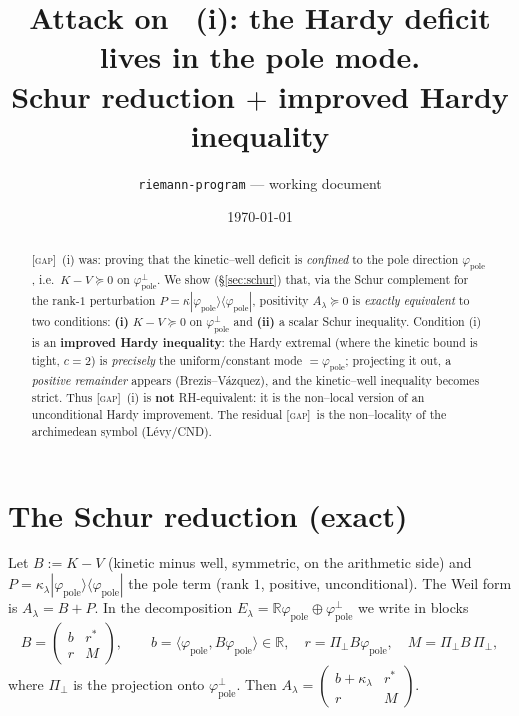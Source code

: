 \documentclass[11pt]{article}
\title{\textbf{Attack on \GAP\ (i): the Hardy deficit lives in the pole mode.\\
Schur reduction $+$ improved Hardy inequality}}
\author{\texttt{riemann-program} --- working document}
\date{\today}
\newcommand{\GAP}{\textcolor{red!75!black}{\textsc{[gap]}}}
\theoremstyle{plain}
\theoremstyle{definition}
\newcommand{\R}{\mathbb{R}}
\newcommand{\El}{E_\lambda}
\newcommand{\kin}{K}
\newcommand{\vv}{V}
\newcommand{\pole}{P}
\newcommand{\fp}{\varphi_{\mathrm{pole}}}
\begin{document}
\maketitle

\begin{abstract}
\GAP\ (i) was: proving that the kinetic--well deficit is \emph{confined} to the
pole direction $\fp$, i.e.\ $\kin-\vv\succeq0$ on $\fp^\perp$. We show
(\S\ref{sec:schur}) that, via the Schur complement for the rank-$1$ perturbation
$\pole=\kappa|\fp\rangle\langle\fp|$, positivity $A_\lambda\succeq0$ is \emph{exactly
equivalent} to two conditions: \textbf{(i)} $\kin-\vv\succeq0$ on $\fp^\perp$ and
\textbf{(ii)} a scalar Schur inequality. Condition (i) is an \textbf{improved Hardy
inequality}: the Hardy extremal (where the kinetic bound is tight, $c=2$) is
\emph{precisely} the uniform/constant mode $=\fp$; projecting it out, a \emph{positive
remainder} appears (Brezis--Vázquez), and the kinetic--well inequality becomes strict.
Thus \GAP\ (i) is \textbf{not} RH-equivalent: it is the non--local version of an
unconditional Hardy improvement. The residual \GAP\ is the non--locality of the
archimedean symbol (Lévy/CND).
\end{abstract}

\tableofcontents

\section{The Schur reduction (exact)}\label{sec:schur}

Let $B:=\kin-\vv$ (kinetic minus well, symmetric, on the arithmetic side) and
$\pole=\kappa_\lambda|\fp\rangle\langle\fp|$ the pole term (rank $1$, positive,
unconditional). The Weil form is $A_\lambda=B+\pole$. In the decomposition
$\El=\R\fp\oplus\fp^\perp$ we write in blocks
\[
  B=\begin{pmatrix} b & r^* \\ r & M\end{pmatrix},
  \qquad
  b=\langle\fp,B\fp\rangle\in\R,\quad r=\Pi_\perp B\fp,\quad M=\Pi_\perp B\,\Pi_\perp,
\]
where $\Pi_\perp$ is the projection onto $\fp^\perp$. Then
$A_\lambda=\begin{pmatrix} b+\kappa_\lambda & r^*\\ r & M\end{pmatrix}$.
\end{document}
